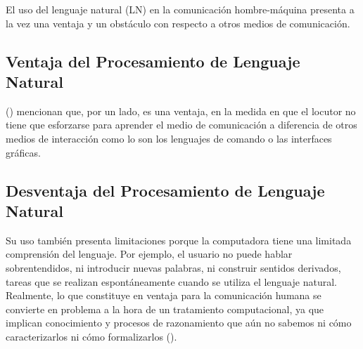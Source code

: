{{El uso del lenguaje natural (LN) en la comunicación hombre-máquina presenta a la vez una ventaja y un obstáculo con respecto a otros medios de comunicación.

\subsection{Ventaja del Procesamiento de Lenguaje Natural}
(\cite{Vasquez2009PLN}) mencionan que, por un lado, es una ventaja, en la medida en que el locutor no tiene que esforzarse para aprender el medio de comunicación a diferencia de otros medios de interacción como lo son los lenguajes de comando o las interfaces gráficas. 

\subsection{Desventaja del Procesamiento de Lenguaje Natural}
Su uso también presenta limitaciones porque la computadora tiene una limitada comprensión del lenguaje. Por ejemplo, el usuario no puede hablar sobrentendidos, ni introducir nuevas palabras, ni construir sentidos derivados, tareas que se realizan espontáneamente cuando se utiliza el lenguaje natural. Realmente, lo que constituye en ventaja para la comunicación humana se convierte en problema a la hora de un tratamiento computacional, ya que implican conocimiento y procesos de razonamiento que aún no sabemos ni cómo caracterizarlos ni cómo formalizarlos (\cite{Vasquez2009PLN}).


}}
